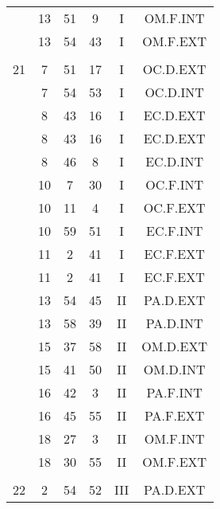 \documentclass[12pt, a4paper]{article}
\begin{document}
\begin{multicols}{3}
{\begin{tabular}{c c c c c c}
	 	 	 	 & 13 & 51 & 9 & I & OM.F.INT\\%
	 	 	 	 & 13 & 54 & 43 & I & OM.F.EXT\\%
	 	 	 	 & & & & & \\%
	 	 	 	21 & 7 & 51 & 17 & I & OC.D.EXT\\%
	 	 	 	 & 7 & 54 & 53 & I & OC.D.INT\\%
	 	 	 	 & 8 & 43 & 16 & I & EC.D.EXT\\%
	 	 	 	 & 8 & 43 & 16 & I & EC.D.EXT\\%
	 	 	 	 & 8 & 46 & 8 & I & EC.D.INT\\%
	 	 	 	 & 10 & 7 & 30 & I & OC.F.INT\\%
	 	 	 	 & 10 & 11 & 4 & I & OC.F.EXT\\%
	 	 	 	 & 10 & 59 & 51 & I & EC.F.INT\\%
	 	 	 	 & 11 & 2 & 41 & I & EC.F.EXT\\%
	 	 	 	 & 11 & 2 & 41 & I & EC.F.EXT\\%
	 	 	 	 & 13 & 54 & 45 & II & PA.D.EXT\\%
	 	 	 	 & 13 & 58 & 39 & II & PA.D.INT\\%
	 	 	 	 & 15 & 37 & 58 & II & OM.D.EXT\\%
	 	 	 	 & 15 & 41 & 50 & II & OM.D.INT\\%
	 	 	 	 & 16 & 42 & 3 & II & PA.F.INT\\%
	 	 	 	 & 16 & 45 & 55 & II & PA.F.EXT\\%
	 	 	 	 & 18 & 27 & 3 & II & OM.F.INT\\%
	 	 	 	 & 18 & 30 & 55 & II & OM.F.EXT\\%
	 	 	 	 & & & & & \\%
	 	 	 	22 & 2 & 54 & 52 & III & PA.D.EXT\\%

\end{tabular}}
\end{multicols}
\end{document}
